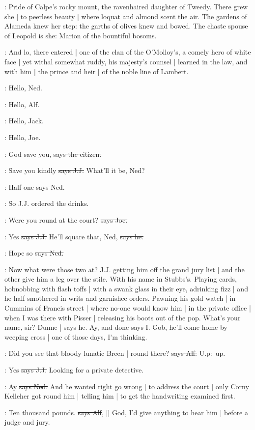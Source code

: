 :
Pride of Calpe's rocky mount,
the ravenhaired daughter of Tweedy.
There grew she |
to peerless beauty |
where loquat and almond scent the air.
The gardens of Alameda knew her step:
the garths of olives knew and bowed.
The chaste spouse of Leopold is she:
Marion of the bountiful bosoms.

:
And lo,
there entered |
one of the clan of the O'Molloy's,
a comely hero of white face |
yet withal somewhat ruddy,
his majesty's counsel |
learned in the law,
and with him |
the prince and heir |
of the noble line of Lambert.

\bergan:
Hello,
Ned.

\lambert:
Hello,
Alf.

\joe:
Hello,
Jack.

\jjom:
Hello,
Joe.

\citizen:
God save you,
\sout{says the citizen.}

\jjom:
Save you kindly
\sout{says J.J.}
What'll it be,
Ned?

\lambert:
Half one
\sout{says Ned.}

\Nq:
So J.J. ordered the drinks.

\joe:
Were you round at the court?
\sout{says Joe.}

\jjom:
Yes
\sout{says J.J.}
He'll square that,
Ned,
\sout{says he.}

\lambert:
Hope so
\sout{says Ned.}

\Nq:
Now what were those two at?
J.J. getting him off the grand jury list |
and the other give him a leg over the stile.
With his name in Stubbs's.
Playing cards,
hobnobbing with flash toffs |
with a swank glass in their eye,
adrinking fizz |
and he half smothered in writs and garnishee orders.
Pawning his gold watch |
in Cummins of Francis street |
where no-one would know him |
in the private office |
when I was there with Pisser |
releasing his boots out of the pop.
What's your name,
sir?
Dunne |
says he.
Ay,
and done
says I.
Gob,
he'll come home by weeping cross |
one of those days,
I'm thinking.%

\bergan:
Did you see that bloody lunatic Breen |
round there?
\sout{says Alf.}
U.p:~up.

\jjom:
Yes
\sout{says J.J.}
Looking for a private detective.

\lambert:
Ay
\sout{says Ned.}
And he wanted right go wrong |
to address the court |
only Corny Kelleher got round him |
telling him |
to get the handwriting examined first.

\bergan:
Ten thousand pounds.
\sout{says Alf},
[]
God,
I'd give anything to hear him |
before a judge and jury.

